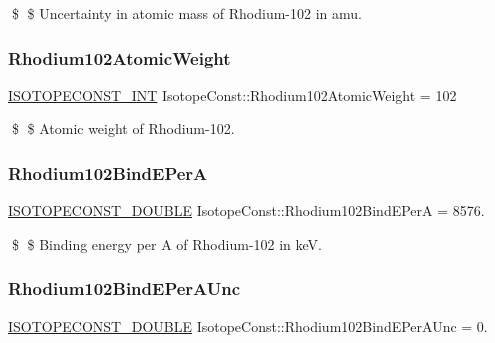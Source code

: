 \$ \$ Uncertainty in atomic mass of Rhodium-\/102 in amu. \mbox{\label{group___isotope_const-_rhodium-_rh102_ga5048de07c6da90f6232b2d249ec1c2e3}} 
\subsubsection{\texorpdfstring{Rhodium102\+Atomic\+Weight}{Rhodium102AtomicWeight}}
{\footnotesize\ttfamily \mbox{\hyperlink{group___isotope_const-_macros_ga5f18360b3e99483a35c32d789e62621c}{I\+S\+O\+T\+O\+P\+E\+C\+O\+N\+S\+T\+\_\+\+I\+NT}} Isotope\+Const\+::\+Rhodium102\+Atomic\+Weight = 102}

\$ \$ Atomic weight of Rhodium-\/102. \mbox{\label{group___isotope_const-_rhodium-_rh102_ga6d8ba226691b902e328c3a8c2350e1eb}} 
\subsubsection{\texorpdfstring{Rhodium102\+Bind\+E\+PerA}{Rhodium102BindEPerA}}
{\footnotesize\ttfamily \mbox{\hyperlink{group___isotope_const-_macros_ga8f45a7272ce02c0b4c65c44636ed719a}{I\+S\+O\+T\+O\+P\+E\+C\+O\+N\+S\+T\+\_\+\+D\+O\+U\+B\+LE}} Isotope\+Const\+::\+Rhodium102\+Bind\+E\+PerA = 8576.}

\$ \$ Binding energy per A of Rhodium-\/102 in keV. \mbox{\label{group___isotope_const-_rhodium-_rh102_ga25e43cd5f70af317f37a79721d9c9bd2}} 
\subsubsection{\texorpdfstring{Rhodium102\+Bind\+E\+Per\+A\+Unc}{Rhodium102BindEPerAUnc}}
{\footnotesize\ttfamily \mbox{\hyperlink{group___isotope_const-_macros_ga8f45a7272ce02c0b4c65c44636ed719a}{I\+S\+O\+T\+O\+P\+E\+C\+O\+N\+S\+T\+\_\+\+D\+O\+U\+B\+LE}} Isotope\+Const\+::\+Rhodium102\+Bind\+E\+Per\+A\+Unc = 0.}

